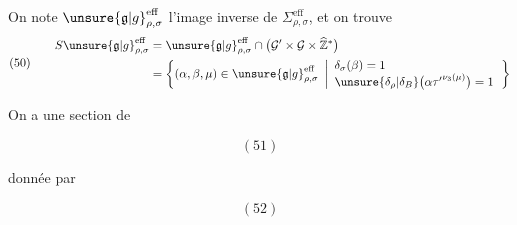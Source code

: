 On note
\(\unsure{\mathfrak{g}|g}_{\rho,\sigma}^{\mathrm{eff}}\)
l'image inverse de
\(\Sigma_{\rho,\sigma}^{\mathrm{eff}}\),
et on trouve
\[
(50)\qquad
\begin{aligned}
S\unsure{\mathfrak{g}|g}_{\rho,\sigma}^{\mathrm{eff}}
&=\unsure{\mathfrak{g}|g}_{\rho,\sigma}^{\mathrm{eff}}
\cap\bigl(\mathcal{G}'\times\mathcal{G}\times\widehat{\mathbb Z}^{*}\bigr)
\\
&=\left\{(\alpha,\beta,\mu)\in
\unsure{\mathfrak{g}|g}_{\rho,\sigma}^{\mathrm{eff}}
\ \left|
\begin{array}{l}
\delta_\sigma(\beta)=1\\
\unsure{\delta_\rho|\delta_B}\bigl(\alpha{\tau'}^{\nu_3(\mu)}\bigr)=1
\end{array}\right.\right\}
\end{aligned}
\]

On a une section de
\begin{samepage}
\[
(51)
\]
\end{samepage}

donnée par
\begin{samepage}
\[
(52)
\]
\end{samepage}

